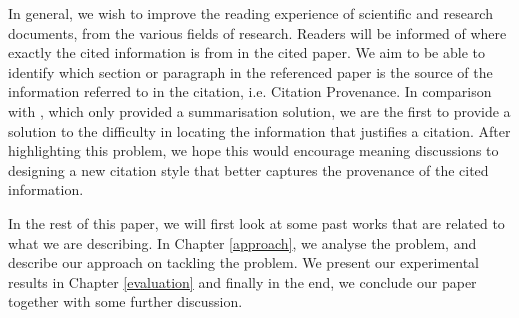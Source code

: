 In general, we wish to improve the reading experience of scientific and research documents, from the various fields of research. Readers will be informed of where exactly the cited information is from in the cited paper. We aim to be able to identify which section or paragraph in the referenced paper is the source of the information referred to in the citation, i.e. Citation Provenance. In comparison with \cite{csibs}, which only provided a summarisation solution, we are the first to provide a solution to the difficulty in locating the information that justifies a citation. After highlighting this problem, we hope this would encourage meaning discussions to designing a new citation style that better captures the provenance of the cited information.
 
In the rest of this paper, we will first look at some past works that are related to what we are describing. In Chapter \ref{approach}, we analyse the problem, and describe our approach on tackling the problem. We present our experimental results in Chapter \ref{evaluation} and finally in the end, we conclude our paper together with some further discussion.
